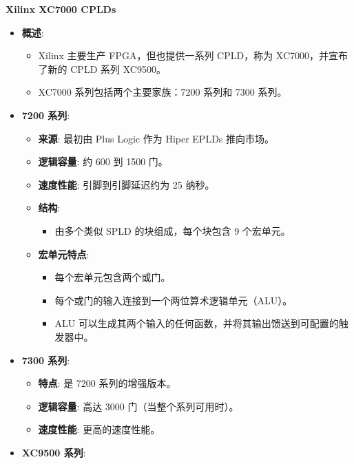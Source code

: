 \documentclass[
  ignorenonframetext,
  chinese,
]{beamer}
\providecommand{\tightlist}{%
  \setlength{\itemsep}{0pt}\setlength{\parskip}{0pt}}
\begin{document}
\begin{frame}
\begin{block}{\textbf{Xilinx XC7000 CPLDs}}
\label{xilinx-xc7000-cplds}
\begin{itemize}
\tightlist
\item
  \textbf{概述}:

  \begin{itemize}
  \tightlist
  \item
    Xilinx 主要生产 FPGA，但也提供一系列 CPLD，称为 XC7000，并宣布了新的
    CPLD 系列 XC9500。
  \item
    XC7000 系列包括两个主要家族：7200 系列和 7300 系列。
  \end{itemize}
\item
  \textbf{7200 系列}:

  \begin{itemize}
  \tightlist
  \item
    \textbf{来源}: 最初由 Plus Logic 作为 Hiper EPLDs 推向市场。
  \item
    \textbf{逻辑容量}: 约 600 到 1500 门。
  \item
    \textbf{速度性能}: 引脚到引脚延迟约为 25 纳秒。
  \item
    \textbf{结构}:

    \begin{itemize}
    \tightlist
    \item
      由多个类似 SPLD 的块组成，每个块包含 9 个宏单元。
    \end{itemize}
  \item
    \textbf{宏单元特点}:

    \begin{itemize}
    \tightlist
    \item
      每个宏单元包含两个或门。
    \item
      每个或门的输入连接到一个两位算术逻辑单元（ALU）。
    \item
      ALU
      可以生成其两个输入的任何函数，并将其输出馈送到可配置的触发器中。
    \end{itemize}
  \end{itemize}
\item
  \textbf{7300 系列}:

  \begin{itemize}
  \tightlist
  \item
    \textbf{特点}: 是 7200 系列的增强版本。
  \item
    \textbf{逻辑容量}: 高达 3000 门（当整个系列可用时）。
  \item
    \textbf{速度性能}: 更高的速度性能。
  \end{itemize}
\item
  \textbf{XC9500 系列}:


\end{itemize}
\end{block}
\end{frame}
\end{document}
